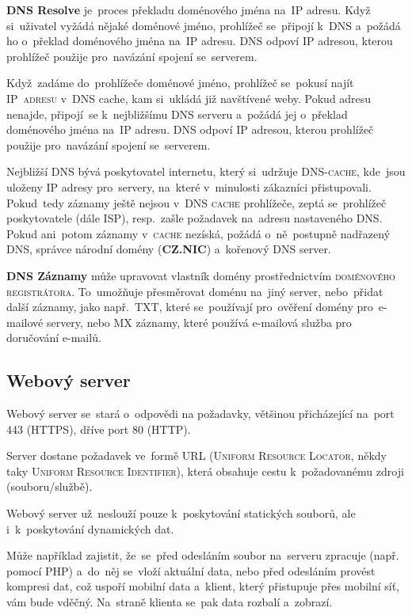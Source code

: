 \documentclass[14pt,a4paper]{article}
\begin{document}
        \textbf{DNS Resolve} je~proces překladu doménového jména na~IP adresu. Když si~uživatel vyžádá nějaké doménové jméno, prohlížeč se~připojí k~\textsc{DNS} a~požádá ho o~překlad doménového jména na~IP adresu. \textsc{DNS} odpoví IP adresou, kterou prohlížeč použije pro~navázání spojení se~serverem.

        Když~zadáme do~prohlížeče doménové jméno, prohlížeč se~pokusí najít \textsc{IP~adresu} v~DNS cache, kam si~ukládá již navštívené weby. Pokud adresu nenajde, připojí~se k~nejbližšímu DNS serveru a~požádá jej o~překlad doménového jména na~IP adresu. DNS odpoví IP adresou, kterou prohlížeč použije pro~navázání spojení se~serverem.

        Nejbližší \textsc{DNS} bývá poskytovatel internetu, který si~udržuje \textsc{DNS-cache}, kde~jsou uloženy \textsc{IP} adresy pro~servery, na~které v~minulosti zákazníci přistupovali. Pokud~tedy záznamy ještě nejsou v~\textsc{DNS cache} prohlížeče, zeptá se~prohlížeč poskytovatele (dále \textsc{ISP}), resp.~zašle požadavek na~adresu nastaveného \textsc{DNS}. Pokud ani~potom záznamy v~\textsc{cache} nezíská, požádá o~ně~postupně nadřazený \textsc{DNS}, správce národní domény (\textbf{CZ.NIC}) a~kořenový DNS server.

        \textbf{DNS Záznamy} může upravovat vlastník domény prostřednictvím \textsc{doménového registrátora}. To~umožňuje přesměrovat doménu na~jiný server, nebo~přidat další záznamy, jako např.~\textsc{TXT}, které se~používají pro~ověření domény pro~e-mailové servery, nebo \textsc{MX} záznamy, které používá e-mailová služba pro doručování e-mailů.\parencite{dns:mdn}

        \subsection{Webový server}
        Webový server se~stará o~odpovědi na požadavky, většinou přicházející na~port 443 (\textsc{HTTPS}), dříve port 80 (\textsc{HTTP}).

        Server dostane požadavek ve~formě URL (\textsc{Uniform Resource Locator}, někdy taky \textsc{Uniform Resource Identifier}), která obsahuje cestu k~požadovanému zdroji (souboru/službě).

        Webový server už~neslouží pouze k~poskytování statických souborů, ale i~k~poskytování dynamických dat.

        Může například zajistit, že~se~před odesláním soubor na~serveru zpracuje (např. pomocí PHP) a~do~něj se~vloží aktuální data, nebo před odesláním provést kompresi dat, což uspoří mobilní data a~klient, který přistupuje přes mobilní síť, vám bude vděčný. Na~straně klienta se~pak data rozbalí a~zobrazí.
\end{document}
